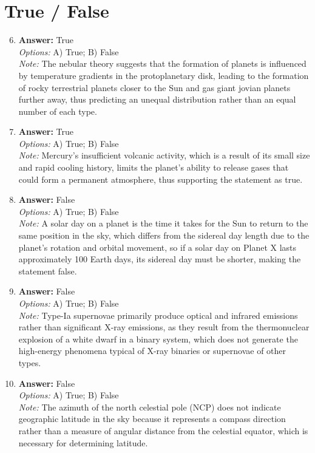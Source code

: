 \documentclass[12pt]{article}
\begin{document}
\section*{True / False}
\begin{enumerate}[label=\arabic*.]
\setcounter{enumi}{5}
\item \textbf{Answer:} True
\\ \textit{Options:} A) True; B) False
\\ \textit{Note:} The nebular theory suggests that the formation of planets is influenced by temperature gradients in the protoplanetary disk, leading to the formation of rocky terrestrial planets closer to the Sun and gas giant jovian planets further away, thus predicting an unequal distribution rather than an equal number of each type.
\item \textbf{Answer:} True
\\ \textit{Options:} A) True; B) False
\\ \textit{Note:} Mercury's insufficient volcanic activity, which is a result of its small size and rapid cooling history, limits the planet's ability to release gases that could form a permanent atmosphere, thus supporting the statement as true.
\item \textbf{Answer:} False
\\ \textit{Options:} A) True; B) False
\\ \textit{Note:} A solar day on a planet is the time it takes for the Sun to return to the same position in the sky, which differs from the sidereal day length due to the planet's rotation and orbital movement, so if a solar day on Planet X lasts approximately 100 Earth days, its sidereal day must be shorter, making the statement false.
\item \textbf{Answer:} False
\\ \textit{Options:} A) True; B) False
\\ \textit{Note:} Type-Ia supernovae primarily produce optical and infrared emissions rather than significant X-ray emissions, as they result from the thermonuclear explosion of a white dwarf in a binary system, which does not generate the high-energy phenomena typical of X-ray binaries or supernovae of other types.
\item \textbf{Answer:} False
\\ \textit{Options:} A) True; B) False
\\ \textit{Note:} The azimuth of the north celestial pole (NCP) does not indicate geographic latitude in the sky because it represents a compass direction rather than a measure of angular distance from the celestial equator, which is necessary for determining latitude.
\end{enumerate}
\end{document}
